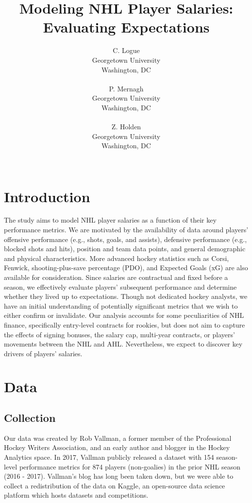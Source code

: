 \documentclass[10pt]{article}
\title{Modeling NHL Player Salaries: Evaluating Expectations}
\author{
  C. Logue \\
  Georgetown University \\
  Washington, DC \\
\\\And
  P. Mernagh \\
  Georgetown University \\
  Washington, DC \\
\\\And
  Z. Holden \\
  Georgetown University \\
  Washington, DC \\
\\}
\begin{document}
\maketitle

\section{Introduction}
The study aims to model NHL player salaries as a function of their key performance metrics. We are motivated by the availability of data around players’ offensive performance (e.g., shots, goals, and assists),  defensive performance (e.g., blocked shots and hits), position and team data points, and general demographic and physical characteristics. More advanced hockey statistics such as Corsi, Fenwick, shooting-plus-save percentage (PDO), and Expected Goals (xG) are also available for consideration. Since salaries are contractual and fixed before a season, we effectively evaluate players’ subsequent performance and determine whether they lived up to expectations. Though not dedicated hockey analysts, we have an initial understanding of potentially significant metrics that we wish to either confirm or invalidate. Our analysis accounts for some peculiarities of NHL finance, specifically entry-level contracts for rookies, but does not aim to capture the effects of signing bonuses, the salary cap, multi-year contracts, or players’ movements between the NHL and AHL. Nevertheless, we expect to discover key drivers of players’ salaries. 

\section{Data}
\subsection{Collection}
Our data was created by Rob Vallman, a former member of the Professional Hockey Writers Association, and an early author and blogger in the Hockey Analytics space. In 2017, Vallman publicly released a dataset with 154 season-level performance metrics for 874 players (non-goalies) in the prior NHL season (2016 - 2017). Vallman’s blog has long been taken down, but we were able to collect a redistribution of the data on Kaggle, an open-source data science platform which hosts datasets and competitions. 
\end{document}
